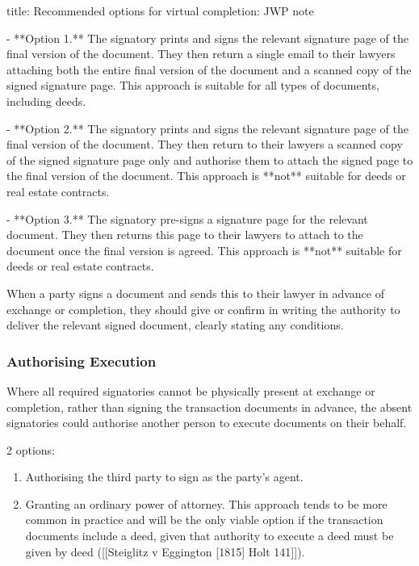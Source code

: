 \documentclass[
]{article}
\newenvironment{Shaded}{}{}
\newcommand{\NormalTok}[1]{#1}
\providecommand{\tightlist}{%
  \setlength{\itemsep}{0pt}\setlength{\parskip}{0pt}}
\begin{document}
\begin{Shaded}
\begin{Highlighting}[]
\NormalTok{title: Recommended options for virtual completion: JWP note}

\NormalTok{{-} **Option 1.** The signatory prints and signs the relevant signature page of the final version of the document. They then return a single email to their lawyers attaching both the entire final version of the document and a scanned copy of the signed signature page. This approach is suitable for all types of documents, including deeds.}

\NormalTok{{-} **Option 2.** The signatory prints and signs the relevant signature page of the final version of the document. They then return to their lawyers a scanned copy of the signed signature page only and authorise them to attach the signed page to the final version of the document. This approach is **not** suitable for deeds or real estate contracts.}

\NormalTok{{-} **Option 3.** The signatory pre{-}signs a signature page for the relevant document. They then returns this page to their lawyers to attach to the document once the final version is agreed. This approach is **not** suitable for deeds or real estate contracts.}
\end{Highlighting}
\end{Shaded}

When a party signs a document and sends this to their lawyer in advance
of exchange or completion, they should give or confirm in writing the
authority to deliver the relevant signed document, clearly stating any
conditions.

\hypertarget{authorising-execution}{%
\subsubsection{Authorising Execution}\label{authorising-execution}}

Where all required signatories cannot be physically present at exchange
or completion, rather than signing the transaction documents in advance,
the absent signatories could authorise another person to execute
documents on their behalf.

2 options:

\begin{enumerate}
\def\labelenumi{\arabic{enumi}.}
\tightlist
\item
  Authorising the third party to sign as the party's agent.
\item
  Granting an ordinary power of attorney. This approach tends to be more
  common in practice and will be the only viable option if the
  transaction documents include a deed, given that authority to execute
  a deed must be given by deed ({[}{[}Steiglitz v Eggington {[}1815{]}
  Holt 141{]}{]}).
\end{enumerate}
\end{document}
